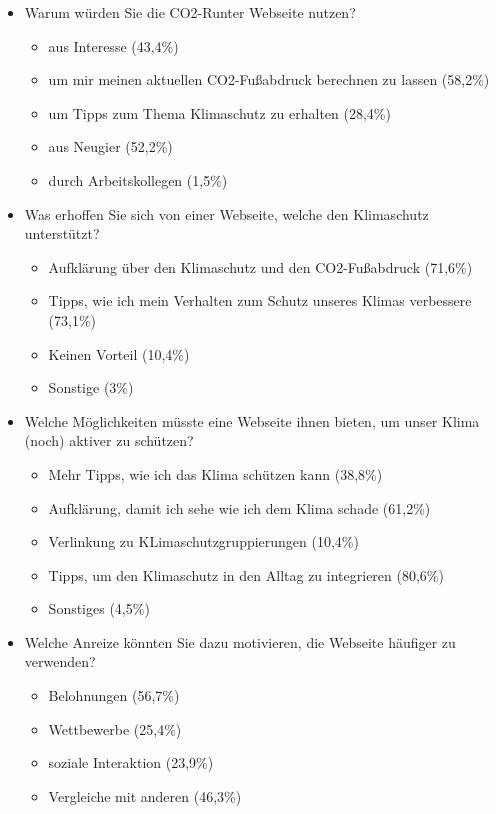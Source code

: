 \begin{itemize}
    \item Warum würden Sie die CO2-Runter Webseite nutzen?
    \begin{itemize}
        \item aus Interesse (43,4\%)
        \item um mir meinen aktuellen CO2-Fußabdruck berechnen zu lassen (58,2\%)
        \item um Tipps zum Thema Klimaschutz zu erhalten (28,4\%)
        \item aus Neugier (52,2\%)
        \item durch Arbeitskollegen (1,5\%)
    \end{itemize}
    \item Was erhoffen Sie sich von einer Webseite, welche den Klimaschutz unterstützt?
    \begin{itemize}
        \item Aufklärung über den Klimaschutz und den CO2-Fußabdruck (71,6\%)
        \item Tipps, wie ich mein Verhalten zum Schutz unseres Klimas verbessere (73,1\%)
        \item Keinen Vorteil (10,4\%)
        \item Sonstige (3\%)
    \end{itemize}
    \item Welche Möglichkeiten müsste eine Webseite ihnen bieten, um unser Klima (noch) aktiver zu schützen?
    \begin{itemize}
        \item Mehr Tipps, wie ich das Klima schützen kann (38,8\%)
        \item Aufklärung, damit ich sehe wie ich dem Klima schade (61,2\%)
        \item Verlinkung zu KLimaschutzgruppierungen (10,4\%)
        \item Tipps, um den Klimaschutz in den Alltag zu integrieren (80,6\%)
        \item Sonstiges (4,5\%)
    \end{itemize}
    \item Welche Anreize könnten Sie dazu motivieren, die Webseite häufiger zu verwenden?
    \begin{itemize}
        \item Belohnungen (56,7\%)
        \item Wettbewerbe (25,4\%)
        \item soziale Interaktion (23,9\%)
        \item Vergleiche mit anderen (46,3\%)

\end{itemize}
\end{itemize}
